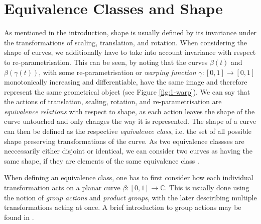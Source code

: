\section{Equivalence Classes and Shape}
\label{sec:2-shape}
As mentioned in the introduction, shape is usually defined by its invariance under the transformations of scaling, translation, and rotation.
When considering the shape of curves, we additionally have to take into account invariance with respect to re-parametrisation.
This can be seen, by noting that the curves $\beta(t)$ and $\beta(\gamma(t))$, with some re-parametrisation or \textit{warping function} $\gamma : [0,1] \rightarrow [0,1]$ monotonically increasing and differentiable, have the same image and therefore represent the same geometrical object (see Figure \ref{fig:1-warp}).
We can say that the actions of translation, scaling, rotation, and re-parametrisation are \textit{equivalence relations} with respect to shape, as each action leaves the shape of the curve untouched and only changes the way it is represented.
The shape of a curve can then be defined as the respective \textit{equivalence class}, i.e. the set of all possible shape preserving transformations of the curve.
As two equivalence classses are neccessarily either disjoint or identical, we can consider two curves as having the same shape, if they are elements of the same equivalence class \parencite[see][40]{SrivastavaKlassen2016}.

When defining an equivalence class, one has to first consider how each individual transformation acts on a planar curve $\beta : [0,1] \rightarrow \mathbb{C}$.
This is usually done using the notion of \textit{group actions} and \textit{product groups}, with the later desciribing multiple transformations acting at once.
A brief introduction to group actions may be found in \cite[Chap.\ 3]{SrivastavaKlassen2016}.

